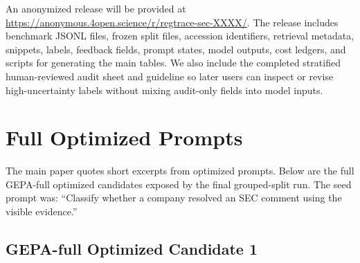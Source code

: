 \documentclass[11pt]{article}
\begin{document}
An anonymized release will be provided at \url{https://anonymous.4open.science/r/regtrace-sec-XXXX/}. The release includes benchmark JSONL files, frozen split files, accession identifiers, retrieval metadata, snippets, labels, feedback fields, prompt states, model outputs, cost ledgers, and scripts for generating the main tables. We also include the completed stratified human-reviewed audit sheet and guideline so later users can inspect or revise high-uncertainty labels without mixing audit-only fields into model inputs.

\clearpage


\appendix

\section{Full Optimized Prompts}
\label{app:prompts}

The main paper quotes short excerpts from optimized prompts. Below are the full GEPA-full optimized candidates exposed by the final grouped-split run. The seed prompt was: ``Classify whether a company resolved an SEC comment using the visible evidence.''

\subsection{GEPA-full Optimized Candidate 1}
\end{document}
